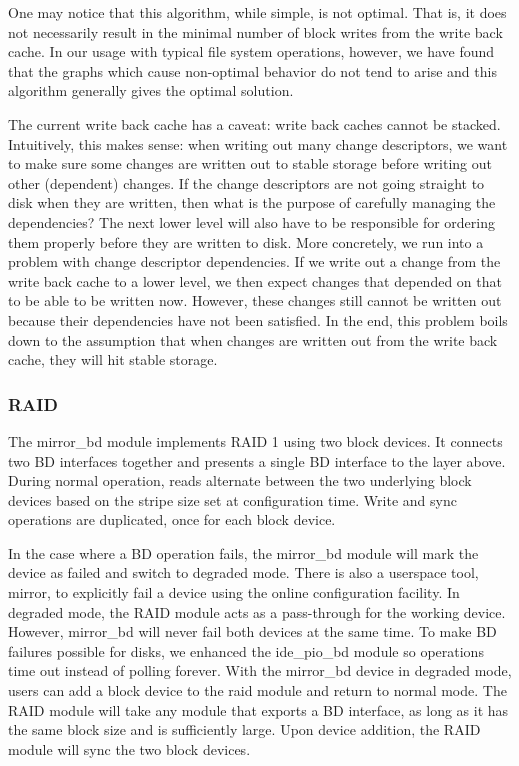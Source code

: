 One may notice that this algorithm, while simple, is not optimal. That is, it
does not necessarily result in the minimal number of block writes from the write
back cache. In our usage with typical file system operations, however, we have
found that the graphs which cause non-optimal behavior do not tend to arise and
this algorithm generally gives the optimal solution.

The current write back cache has a caveat: write back caches cannot be stacked.
Intuitively, this makes sense: when writing out many change descriptors, we want
to make sure some changes are written out to stable storage before writing out
other (dependent) changes. If the change descriptors are not going straight to
disk when they are written, then what is the purpose of carefully managing the
dependencies? The next lower level will also have to be responsible for ordering
them properly before they are written to disk. More concretely, we run into a
problem with change descriptor dependencies. If we write out a change from the
write back cache to a lower level, we then expect changes that depended on that
to be able to be written now. However, these changes still cannot be written out
because their dependencies have not been satisfied. In the end, this problem
boils down to the assumption that when changes are written out from the write
back cache, they will hit stable storage.

\subsubsection{RAID}
\label{sec:solution:impl:raid}

The mirror\_bd module implements RAID 1 using two block devices. It connects two
BD interfaces together and presents a single BD interface to the layer above.
During normal operation, reads alternate between the two underlying block
devices based on the stripe size set at configuration time. Write and sync
operations are duplicated, once for each block device.

In the case where a BD operation fails, the mirror\_bd module will mark the
device as failed and switch to degraded mode. There is also a userspace tool,
mirror, to explicitly fail a device using the online configuration facility. In
degraded mode, the RAID module acts as a pass-through for the working device.
However, mirror\_bd will never fail both devices at the same time. To make BD
failures possible for disks, we enhanced the ide\_pio\_bd module so operations
time out instead of polling forever. With the mirror\_bd device in degraded
mode, users can add a block device to the raid module and return to normal mode.
The RAID module will take any module that exports a BD interface, as long as it
has the same block size and is sufficiently large. Upon device addition, the
RAID module will sync the two block devices.

